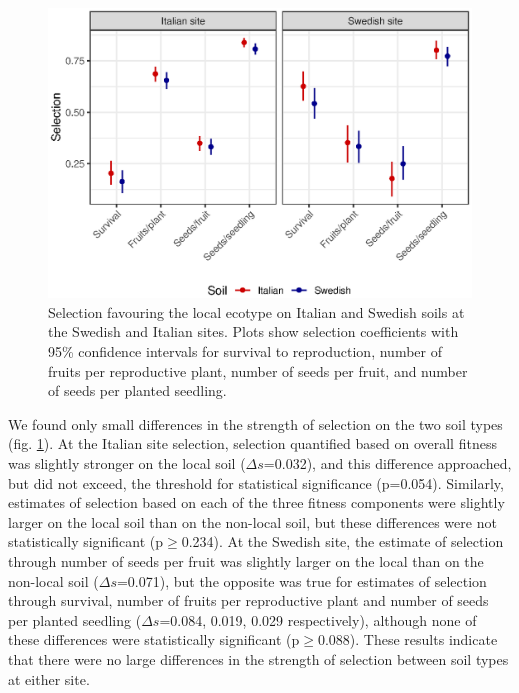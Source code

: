 \documentclass[twocolumn,twoside,lettersize]{article}
\begin{document}
\begin{figure}[]
  \begin{center}
      \includegraphics[]{figure2.eps}
      \caption{
        Selection favouring the local ecotype on Italian  and Swedish soils at the Swedish and Italian sites. Plots show selection coefficients with 95\% confidence intervals for survival to reproduction, number of fruits per reproductive plant, number of seeds per fruit, and number of seeds per planted seedling.
      }
      \label{fig:02_selection}
  \end{center}
\end{figure}

We found only small differences in the strength of selection on the two soil types (fig. \ref{fig:02_selection}). At the Italian site selection, selection quantified based on overall fitness was slightly stronger on the local soil ($\Delta s$=0.032), and this difference approached, but did not exceed, the threshold for statistical significance (p=0.054). Similarly, estimates of selection based on each of the three fitness components were slightly larger on the local soil than on the non-local soil, but these differences were not statistically significant (p$\geq$0.234). At the Swedish site, the estimate of selection through number of seeds per fruit was slightly larger on the local than on the non-local soil ($\Delta s$=0.071), but the opposite was true for estimates of selection through survival, number of fruits per reproductive plant and number of seeds per planted seedling ($\Delta s$=0.084, 0.019, 0.029 respectively), although none of these differences were statistically significant (p$\geq$0.088). These results indicate that there were no large differences in the strength of selection between soil types at either site.
\end{document}
